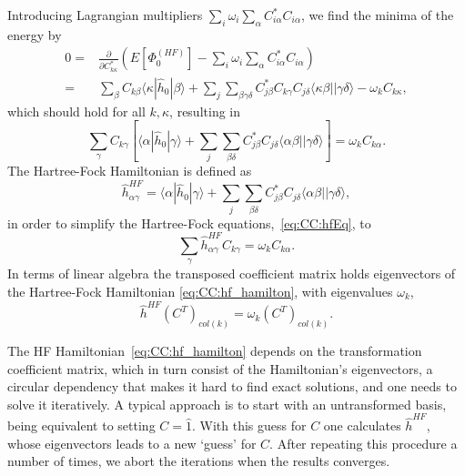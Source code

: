 Introducing Lagrangian multipliers $\sum_i \omega_i \sum_{\alpha} C_{i\alpha}^{*} C_{i\alpha}$, we find the minima of the energy by
\begin{equation}
\begin{split}
0 
=&
\frac{\partial}{\partial C^{*}_{k\kappa}} \left(E\left[\Phi_0^{(HF)}\right]  - \sum_i \omega_i \sum_{\alpha} C_{i\alpha}^{*} C_{i\alpha} \right) \\
=&
\sum_{ \beta} C_{k\beta} \langle \kappa | \hat{h}_0 | \beta \rangle 
+
 \sum_{j} \sum_{ \beta \gamma \delta}
C_{j\beta}^{*} C_{k\gamma} C_{j\delta} \langle \kappa \beta || \gamma \delta \rangle 
- 
\omega_k  C_{k\kappa} ,
\end{split}
\end{equation}
which should hold for all $k,\kappa$, resulting in 
\begin{equation}
\label{eq:CC:hfEq}
\sum_{ \gamma} C_{k\gamma} \left[ 
\langle \alpha | \hat{h}_0 | \gamma \rangle 
+
 \sum_{j} \sum_{ \beta \delta}
C_{j\beta}^{*} C_{j\delta} \langle \alpha \beta || \gamma \delta \rangle 
\right] 
=
\omega_k  C_{k\alpha}  .
\end{equation}
The Hartree-Fock Hamiltonian is defined as
\begin{equation}
\label{eq:CC:hf_hamilton}
\hat{h}_{\alpha\gamma}^{HF}
= 
\langle \alpha | \hat{h}_0 | \gamma \rangle 
+
 \sum_{j} \sum_{ \beta \delta}
C_{j\beta}^{*} C_{j\delta} \langle \alpha \beta || \gamma \delta \rangle ,
\end{equation}
in order to simplify the Hartree-Fock equations,~\eqref{eq:CC:hfEq}, to
\begin{equation}
\sum_{ \gamma} \hat{h}_{\alpha\gamma}^{HF} C_{k\gamma}
=
\omega_k  C_{k\alpha}  .
\end{equation}
In terms of linear algebra the transposed coefficient matrix holds eigenvectors of the Hartree-Fock Hamiltonian \eqref{eq:CC:hf_hamilton}, with eigenvalues $\omega_k$,
\begin{equation}
\hat{h}^{HF} (C^T)_{col(k)}
=
\omega_k  (C^T)_{col(k)} .
\end{equation}


The HF Hamiltonian~\eqref{eq:CC:hf_hamilton} depends on the transformation coefficient matrix, which in turn consist of the Hamiltonian's eigenvectors, a circular dependency that makes it hard to find exact solutions, and one needs to solve it iteratively.
A typical approach is to start with an untransformed basis, being equivalent to setting $C = \hat{1}$. 
With this guess for $C$ one calculates $\hat{h}^{HF}$, whose eigenvectors leads to a new `guess' for $C$. 
After repeating this procedure a number of times, we abort the iterations when the results converges.

